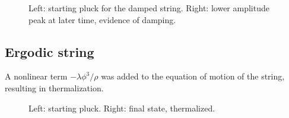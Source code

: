 \documentclass[12pt]{article}
\begin{document}
\begin{figure}[H]
  \caption{Left: starting pluck for the damped string. Right: lower amplitude peak at later time, evidence of damping.}
\end{figure}

\subsection{Ergodic string}

A nonlinear term $-\lambda \phi^3 / \rho$ was added to the equation of motion of the string, resulting in thermalization.

\begin{figure}[H]
  \caption{Left: starting pluck. Right: final state, thermalized.}
\end{figure}
\end{document}
